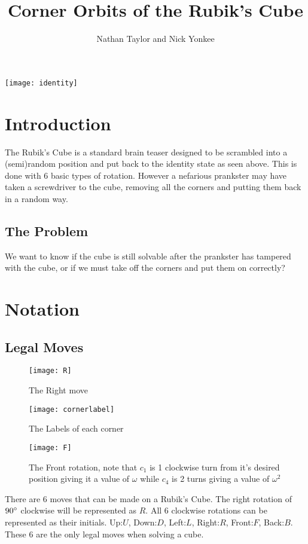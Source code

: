 \documentclass{article}
\title{Corner Orbits of the Rubik's Cube}
\author{Nathan Taylor and Nick Yonkee}
\begin{document}
\maketitle

\newpage



\texttt{[image: identity]}
\section{Introduction}

The Rubik's Cube is a standard brain teaser designed to be scrambled into a (semi)random position and put back to the identity state as seen above. This is done with 6 basic types of rotation. However a nefarious prankster may have taken a screwdriver to the cube, removing all the corners and putting them back in a random way.


\subsection{The Problem}

We want to know if the cube is still solvable after the prankster has tampered with the cube, or if we must take off the corners and put them on correctly?

\section{Notation}
\subsection{Legal Moves}
\newpage



\begin{wrapfigure}{2.3}{0.25\textwidth}
\captionsetup{width=2\linewidth}
\texttt{[image: R]} 
\caption{The Right move}
\texttt{[image: cornerlabel]} 
\caption{The Labels of each corner}
\texttt{[image: F]} 
\caption{The Front rotation, note that $c_1$ is 1 clockwise turn from it's desired position giving it a value of $\omega$ while $c_4$ is 2 turns giving a value of $\omega^2$}
\label{fig:subim1}
\end{wrapfigure}
 There are 6 moves that can be made on a Rubik's Cube. The right rotation of $90\degree$ clockwise will be represented as $R$. All 6 clockwise rotations can be represented as their initials. Up:$U$, Down:$D$, Left:$L$, Right:$R$, Front:$F$, Back:$B$.  These 6 are the only legal moves when solving a cube.
\end{document}
